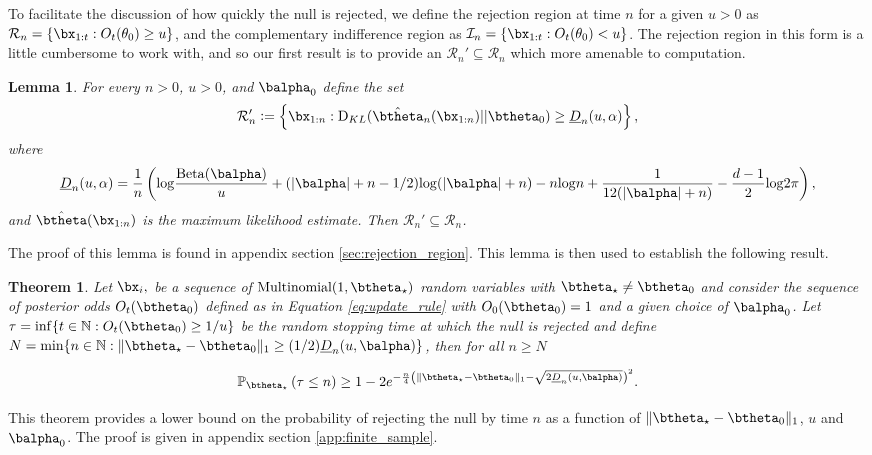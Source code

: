 \documentclass[11pt]{article}
\def\log{{\rm log}}
\newcommand{\Beta}{\mathrm{Beta}}
\newcommand{\KL}{\mathrm{D}_{KL}}
\newtheorem{thm}{Theorem}[section]
\newtheorem{lemma}{Lemma}[section]
\newcommand{\df}{\vcentcolon=}
\begin{document}
To facilitate the discussion of how quickly the null is rejected, we define the rejection region at time $n$ for a given $u>0$ as $\mathcal{R}_n = \{ \bx_{1:t} : O_t(\theta_0) \geq u \}$,
and the complementary indifference region as $\mathcal{I}_n = \{ \bx_{1:t} : O_t(\theta_0) < u \}$. 
The rejection region in this form is a little cumbersome to work with,
and so our first result is to provide an $\mathcal R_n'\subseteq \mathcal R_n$ which more amenable to computation.
\begin{lemma}\label{thm:calRprime}
  For every $n>0$, $u>0$, and $\balpha_0$ define the set
  \begin{equation}
    \label{eq:decision_boundary}
    \mathcal R_n'\df 
    \left\{
      \bx_{1:n} :
      \KL(\hat\btheta_n(\bx_{1:n})|| \btheta_0)
      \geq \underline{D}_n(u,\alpha) 
    \right\},
  \end{equation}
  where
  \begin{equation*}
    \underline{D}_n(u,\alpha) = \frac{1}{n}\left( \log \frac{\Beta(\balpha)}{u} +(|\balpha|+n-1/2)\log(|\balpha|+n)-n\log n + \frac{1}{12(|\balpha|+n)} - \frac{d-1}{2}\log 2\pi\right),
  \end{equation*}
  and $\hat{\btheta}(\bx_{1:n})$ is the maximum likelihood estimate.
Then $\mathcal{R}_n'  \subseteq \mathcal R_n$.
\end{lemma}
The proof of this lemma is found in appendix section \ref{sec:rejection_region}.
This lemma is then used to establish the following result.


\begin{thm}
  \label{thm:finite_sample}
\noindent Let $\bx_i,$ be a sequence of $\text{Multinomial}(1,\btheta_{\star})$ random variables with $\btheta_{\star} \neq \btheta_0$ and consider the sequence of posterior odds $O_t(\btheta_0)$ defined as in Equation \eqref{eq:update_rule} with $O_0(\btheta_0)=1$ and a given choice of $\balpha_0$.
Let $\tau = \inf \lbrace t \in \mathbb{N}: O_t(\btheta_0) \geq 1/u \rbrace$ be the random stopping time at which the null is rejected and define $N = \min \{n \in \mathbb{N} : \|\btheta_\star - \btheta_0\|_1 \geq (1/2)\underline{D}_n(u,\balpha)\}$, then for all $n\geq N$

\begin{equation}
  \label{eq:finite_sample}
\mathbb{P}_{\btheta_{\star}}\left( \tau \leq  n \right) \geq
 1 -2e^{-\frac{n}{4}\left(\|\btheta_\star - \btheta_0\|_1-\sqrt{2\underline{D}_n(u,\balpha)}\right)^2}.
\end{equation}
\end{thm}
\noindent This theorem provides a lower bound on the probability of rejecting the null by time $n$ as a function of $\|\btheta_\star - \btheta_0\|_1$, $u$ and $\balpha_0$.
The proof is given in appendix section \ref{app:finite_sample}. 
\end{document}

